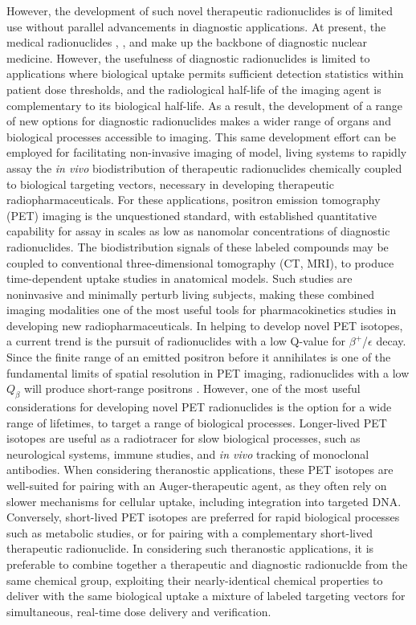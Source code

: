 However, the development of such novel therapeutic radionuclides is of limited use without parallel advancements in diagnostic applications.
At present, the  medical radionuclides , , and  make up the backbone of diagnostic nuclear medicine.
However, the usefulness of diagnostic radionuclides is limited to applications where biological uptake permits sufficient detection statistics within patient dose thresholds, and the radiological half-life of the imaging agent is complementary to its biological half-life. 
As a result, the development of a range of new options for diagnostic radionuclides makes a wider range of organs and biological processes accessible to imaging.
This same development effort can be employed for facilitating  non-invasive imaging of model, living systems to rapidly assay the \emph{in vivo} biodistribution of therapeutic radionuclides chemically coupled to biological targeting vectors, necessary in developing therapeutic radiopharmaceuticals.
For these applications, positron emission tomography (PET) imaging is the unquestioned standard, with established quantitative capability for assay in scales as low as  nanomolar concentrations of diagnostic radionuclides. 
The biodistribution signals of these  labeled compounds may be coupled to conventional three-dimensional tomography (CT, MRI), to produce time-dependent uptake studies in anatomical models.
Such studies are noninvasive and minimally perturb living subjects, making these combined imaging modalities one of the most useful tools for pharmacokinetics studies in developing new radiopharmaceuticals.
In helping to develop novel PET isotopes, a current trend is the pursuit of radionuclides with a low Q-value for  $\beta^+$/$\epsilon$ decay.
Since the finite range of an emitted positron before it annihilates is one of the fundamental limits of spatial resolution in PET imaging, radionuclides with a low $Q_\beta$ will produce short-range positrons  \cite{bushberg2011essential}.
However, one of the most useful considerations for developing novel PET radionuclides is the option for a wide range of lifetimes, to target a range of biological processes.
Longer-lived PET isotopes are useful as a  radiotracer for slow biological processes, such as neurological systems, immune studies, and \emph{in vivo} tracking of  monoclonal antibodies.
When considering theranostic applications, these PET isotopes are well-suited for pairing with an Auger-therapeutic agent, as they often rely on slower mechanisms for cellular uptake, including integration into targeted DNA.
Conversely, short-lived PET isotopes are preferred for rapid biological processes such as metabolic studies, or for pairing with a complementary short-lived therapeutic radionuclide.
In considering such theranostic applications, it is preferable to combine together a therapeutic and diagnostic radionuclde from the same chemical group, exploiting their nearly-identical chemical properties to deliver with the same biological uptake a mixture of labeled targeting vectors for simultaneous, real-time dose delivery and verification. 






